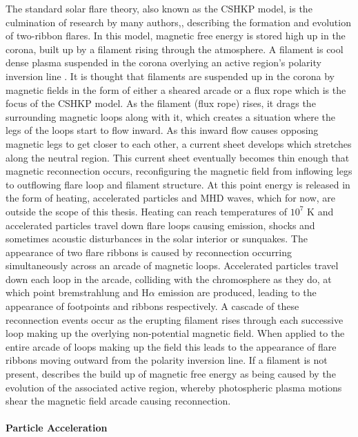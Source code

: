 The standard solar flare theory, also known as the CSHKP model, is the culmination of research by many authors,\citep{1964NASSP..50..451C, 1966Natur.211..695S, 1974SoPh...34..323H, 1976SoPh...50...85K}, describing the formation and evolution of two-ribbon flares. In this model, magnetic free energy is stored high up in the corona, built up by a filament rising through the atmosphere. A filament is cool dense plasma suspended in the corona overlying an active region's polarity inversion line \citep{1955ApJ...121..349B}. It is thought that filaments are suspended up in the corona by magnetic fields in the form of either a sheared arcade or a flux rope which is the focus of the CSHKP model. As the filament (flux rope) rises, it drags the surrounding magnetic loops along with it, which creates a situation where the legs of the loops start to flow inward. As this inward flow causes opposing magnetic legs to get closer to each other, a current sheet develops which stretches along the neutral region. This current sheet eventually becomes thin enough that magnetic reconnection occurs, reconfiguring the magnetic field from inflowing legs to outflowing flare loop and filament structure. At this point energy is released in the form of heating, accelerated particles and MHD waves, which for now, are outside the scope of this thesis. Heating can reach temperatures of $10^7$ K and accelerated particles travel down flare loops causing emission, shocks and sometimes acoustic disturbances in the solar interior or sunquakes. The appearance of two flare ribbons is caused by reconnection occurring simultaneously across an arcade of magnetic loops. Accelerated particles travel down each loop in the arcade, colliding with the chromosphere as they do, at which point bremstrahlung and H$\alpha$ emission are produced, leading to the appearance of footpoints and ribbons respectively. A cascade of these reconnection events occur as the erupting filament rises through each successive loop making up the overlying non-potential magnetic field. When applied to the entire arcade of loops making up the field this leads to the appearance of flare ribbons moving outward from the polarity inversion line. If a filament is not present, \cite{2005psci.book.....A} describes the build up of magnetic free energy as being caused by the evolution of the associated active region, whereby photospheric plasma motions shear the magnetic field arcade causing reconnection. 


\paragraph{Particle Acceleration}

